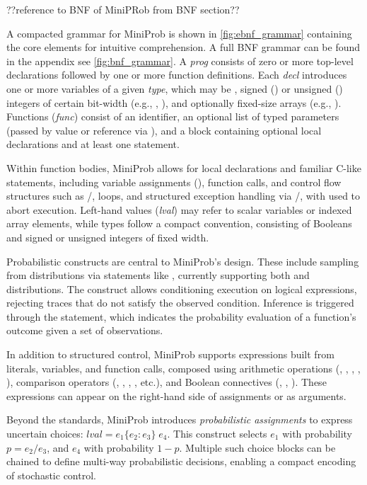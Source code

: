 ??reference to BNF of MiniPRob from BNF section??

A compacted grammar for MiniProb is shown in \ref{fig:ebnf_grammar} containing the core elements for intuitive comprehension.
A full BNF grammar can be found in the appendix see \ref{fig:bnf_grammar}.
A \emph{prog} consists of zero or more top-level declarations followed by one or more function definitions. Each \emph{decl} introduces one or more variables of a
given \emph{type}, which may be , signed () or unsigned () integers of certain bit-width (e.g., , ),
and optionally fixed-size arrays (e.g., ). Functions (\emph{func}) consist of an identifier, an optional list of typed parameters (passed by value or
reference via \code{\&}), and a block containing optional local declarations and at least one statement.

Within function bodies, MiniProb allows for local declarations and familiar C-like statements, including variable assignments (),
function calls, and control flow structures such as /,  loops, and structured exception handling via /,
with  used to abort execution. Left-hand values (\emph{lval}) may refer to scalar variables or indexed array elements, while types follow a compact
convention, consisting of Booleans and signed or unsigned integers of fixed width.

Probabilistic constructs are central to MiniProb's design. These include sampling from distributions via statements like ,
currently supporting both  and  distributions. The  construct allows conditioning execution on logical expressions,
rejecting traces that do not satisfy the observed condition. Inference is triggered through the  statement, which indicates
the probability evaluation of a function's outcome given a set of observations.

In addition to structured control, MiniProb supports expressions built from literals, variables, and function calls, composed using arithmetic
operations (\code{+}, \code{-}, \code{*}, \code{/}, \code{\%}), comparison operators (\code{==}, \code{!=}, \code{<}, \code{<=}, etc.), and Boolean connectives
(\code{!}, \code{\&\&}, \code{||}). These expressions can appear on the right-hand side of assignments or as arguments.

Beyond the standards, MiniProb introduces \emph{probabilistic assignments} to express uncertain choices: $lval = e_1 \{ e_2 : e_3 \} \; e_4$.
This construct selects $e_1$ with probability $p = e_2 / e_3$, and $e_4$ with probability $1 - p$.
Multiple such choice blocks can be chained to define multi-way probabilistic decisions, enabling a compact encoding of stochastic control.

